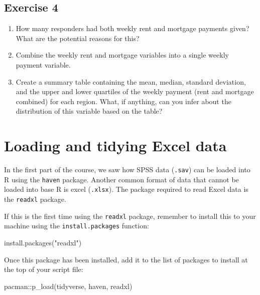 \documentclass[
  letterpaper,
  DIV=11,
  numbers=noendperiod]{scrreprt}
\newenvironment{Shaded}{\begin{snugshade}}{\end{snugshade}}
\newcommand{\FunctionTok}[1]{\textcolor[rgb]{0.28,0.35,0.67}{#1}}
\newcommand{\NormalTok}[1]{\textcolor[rgb]{0.00,0.23,0.31}{#1}}
\newcommand{\SpecialCharTok}[1]{\textcolor[rgb]{0.37,0.37,0.37}{#1}}
\newcommand{\StringTok}[1]{\textcolor[rgb]{0.13,0.47,0.30}{#1}}
\begin{document}
\section{Exercise 4}\label{exercise-4}

\begin{enumerate}
\def\labelenumi{\arabic{enumi}.}
\item
  How many responders had both weekly rent and mortgage payments given?
  What are the potential reasons for this?
\item
  Combine the weekly rent and mortgage variables into a single weekly
  payment variable.
\item
  Create a summary table containing the mean, median, standard
  deviation, and the upper and lower quartiles of the weekly payment
  (rent and mortgage combined) for each region. What, if anything, can
  you infer about the distribution of this variable based on the table?
\end{enumerate}


\chapter{Loading and tidying Excel
data}\label{loading-and-tidying-excel-data}

In the first part of the course, we saw how SPSS data (\texttt{.sav})
can be loaded into R using the \texttt{haven} package. Another common
format of data that cannot be loaded into base R is excel
(\texttt{.xlsx}). The package required to read Excel data is the
\texttt{readxl} package.

If this is the first time using the \texttt{readxl} package, remember to
install this to your machine using the \texttt{install.packages}
function:

\begin{Shaded}
\begin{Highlighting}[]
\FunctionTok{install.packages}\NormalTok{(}\StringTok{"readxl"}\NormalTok{)}
\end{Highlighting}
\end{Shaded}

Once this package has been installed, add it to the list of packages to
install at the top of your script file:

\begin{Shaded}
\begin{Highlighting}[]
\NormalTok{pacman}\SpecialCharTok{::}\FunctionTok{p\_load}\NormalTok{(tidyverse, haven, readxl)}
\end{Highlighting}
\end{Shaded}
\end{document}
